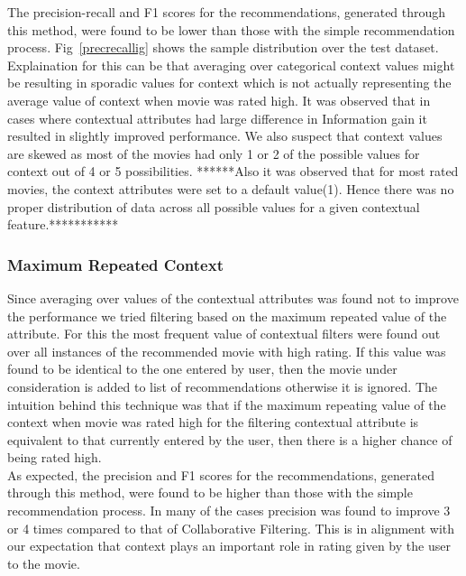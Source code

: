 \documentclass{article}
\begin{document}
The precision-recall and F1 scores for the recommendations, generated through this method, were found to be lower than those with the simple recommendation process. Fig~\ref{precrecallig} shows the sample distribution over the test dataset. Explaination for this can be that averaging over categorical context values might be resulting in sporadic values for context which is not actually representing the average value of context when movie was rated high. It was observed that in cases where contextual attributes had large difference in Information gain it resulted in slightly improved performance. We also suspect that context values are skewed as most of the movies had only 1 or 2 of the possible values for context out of 4 or 5 possibilities. ******Also it was observed that for most rated movies, the context attributes were set to a default value(1). Hence there was no proper distribution of data across all possible values for a given contextual feature.***********

\subsubsection{Maximum Repeated Context}

Since averaging over values of the contextual attributes was found not to improve the performance we tried filtering based on the maximum repeated value of the attribute. For this the most frequent value of contextual filters were found out over all instances of the recommended movie with high rating. If this value was found to be identical to the one entered by user, then the movie under consideration is added to list of recommendations otherwise it is ignored. The intuition behind this technique was that if the maximum repeating value of the context when movie was rated high for the filtering contextual attribute is equivalent to that currently entered by the user, then there is a higher chance of being rated high. \\

As expected, the precision and F1 scores for the recommendations, generated through this method, were found to be higher than those with the simple recommendation process. In many of the cases precision was found to improve 3 or 4 times compared to that of Collaborative Filtering. This is in alignment with our expectation that context plays an important role in rating given by the user to the movie.
\end{document}
